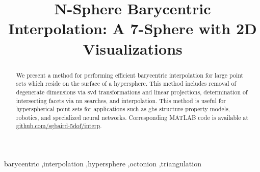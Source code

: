 \documentclass[final,12pt]{elsarticle}
\begin{document}
	
	\sloppy %
	
	\begin{frontmatter}
		
		\title{N-Sphere Barycentric Interpolation: A 7-Sphere with 2D Visualizations}
		
		
		
		\begin{abstract}
			We present a method for performing efficient barycentric interpolation for large point sets which reside on the surface of a hypersphere. This method includes removal of degenerate dimensions via \gls{svd} transformations and linear projections, determination of intersecting facets via \gls{nn} searches, and interpolation. This method is useful for hyperspherical point sets for applications such as \glspl{gb} structure-property models, robotics, and specialized neural networks. Corresponding MATLAB code is available at \url{github.com/sgbaird-5dof/interp}.
		\end{abstract}
	
	\begin{keyword}
		barycentric \sep interpolation \sep hypersphere \sep octonion \sep triangulation %
	\end{keyword}

	\end{frontmatter}
\end{document}
